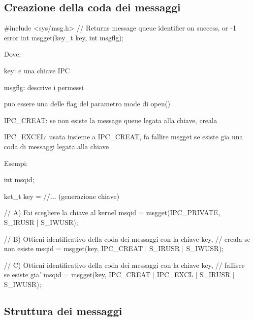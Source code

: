 \subsection*{Creazione della coda dei messaggi}


\begin{DoxyCode}
\textcolor{preprocessor}{#include <sys/msg.h>}
\textcolor{comment}{// Returns message queue identifier on success, or -1 error}
\textcolor{keywordtype}{int} msgget(key\_t key, \textcolor{keywordtype}{int} msgflg);
\end{DoxyCode}


Dove\+:
\begin{DoxyItemize}
\item {\ttfamily key}\+: e\textquotesingle{} una chiave I\+PC
\item {\ttfamily msgflg}\+: descrive i permessi
\begin{DoxyItemize}
\item puo\textquotesingle{} essere una delle flag del parametro {\ttfamily mode} di {\ttfamily open()}
\item {\ttfamily I\+P\+C\+\_\+\+C\+R\+E\+AT}\+: se non esiste la message queue legata alla chiave, creala
\item {\ttfamily I\+P\+C\+\_\+\+E\+X\+C\+EL}\+: usata insieme a {\ttfamily I\+P\+C\+\_\+\+C\+R\+E\+AT}, fa fallire msgget se esiste gia\textquotesingle{} una coda di messaggi legata alla chiave
\end{DoxyItemize}
\end{DoxyItemize}

Esempi\+: 
\begin{DoxyCode}
\textcolor{keywordtype}{int} msqid;

ket\_t key = \textcolor{comment}{//... (generazione chiave)}

\textcolor{comment}{// A) Fai scegliere la chiave al kernel}
msqid = msgget(IPC\_PRIVATE, S\_IRUSR | S\_IWUSR);

\textcolor{comment}{// B) Ottieni identificativo della coda dei messaggi con la chiave key,}
\textcolor{comment}{//    creala se non esiste}
msqid = msgget(key, IPC\_CREAT | S\_IRUSR | S\_IWUSR);

\textcolor{comment}{// C) Ottieni identificativo della coda dei messaggi con la chiave key,}
\textcolor{comment}{//    fallisce se esiste gia'}
msqid = msgget(key, IPC\_CREAT | IPC\_EXCL | S\_IRUSR | S\_IWUSR);
\end{DoxyCode}


\subsection*{Struttura dei messaggi}

